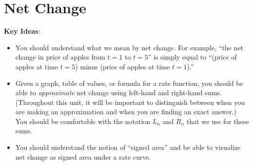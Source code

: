 \documentclass[main]{subfiles}
\begin{document}
\ifSubfilesClassLoaded{%
  \chaptermark{\chapterfive}
}{}

\section{Net Change} \label{ws5-1}

\begin{problemonly}
    \begin{framed}

\textbf{Key Ideas}:

\begin{itemize}[topsep=0pt,partopsep=0pt,parsep=8pt,itemsep=0pt]

\item You should understand what we mean by net change.  For example,
  ``the net change in price of apples from $t = 1$ to $t = 5$'' is
  simply equal to ``(price of apples at time $t = 5$) minus (price of
  apples at time $t = 1$).''

\item Given a graph, table of values, or formula for a rate function,
  you should be able to \emph{approximate} net change using left-hand
  and right-hand sums.  (Throughout this unit, it will be important to
  distinguish between when you are making an approximation and when you
  are finding an exact answer.)  You should be comfortable with the
  notation $L_n$ and $R_n$ that we use for these sums.

\item You should understand the notion of ``signed area'' and be able to
  visualize net change as signed area under a rate curve.

\end{itemize}
\end{framed}
\end{problemonly}
\end{document}
